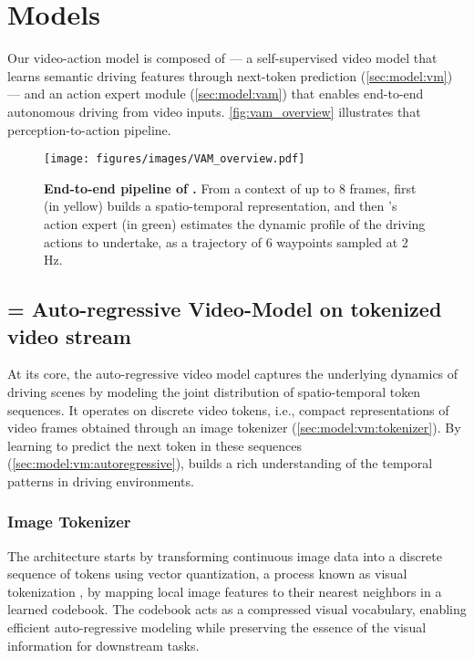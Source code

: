 

\section{Models}
\label{sec:method}


Our video-action model \vam{} is composed of \vm{} --- a self-supervised video model that learns semantic driving features through next-token prediction (\autoref{sec:model:vm}) --- and an action expert module (\autoref{sec:model:vam}) that enables end-to-end autonomous driving from video inputs.
\autoref{fig:vam_overview} illustrates that perception-to-action pipeline.



\begin{figure}[t]
    \centering
    \texttt{[image: figures/images/VAM\_overview.pdf]}
    \caption{\textbf{End-to-end pipeline of \vam{}.} 
    From a context of up to 8 frames, first \vm (in yellow) builds a spatio-temporal representation, and then \vam{}'s action expert (in green) estimates the dynamic profile of the driving actions to undertake, as a trajectory of 6 waypoints sampled at 2 Hz.}
    \label{fig:vam_overview}
\end{figure}

\subsection{\vm{} = Auto-regressive Video-Model on tokenized video stream}
\label{sec:model:vm}

At its core, the auto-regressive video model captures the underlying dynamics of driving scenes by modeling the joint distribution of spatio-temporal token sequences. It operates on discrete video tokens, i.e., compact representations of video frames obtained through an image tokenizer (\autoref{sec:model:vm:tokenizer}). By learning to predict the next token in these sequences (\autoref{sec:model:vm:autoregressive}), \vm{} builds a rich understanding of the temporal patterns in driving environments.

\subsubsection{Image Tokenizer}
\label{sec:model:vm:tokenizer}

The architecture starts by transforming continuous image data into a discrete sequence of tokens using vector quantization, a process known as visual tokenization \citep{van2017vqvae}, by mapping local image features to their nearest neighbors in a learned codebook. The codebook acts as a compressed visual vocabulary, enabling efficient auto-regressive modeling while preserving the essence of the visual information for downstream tasks.

